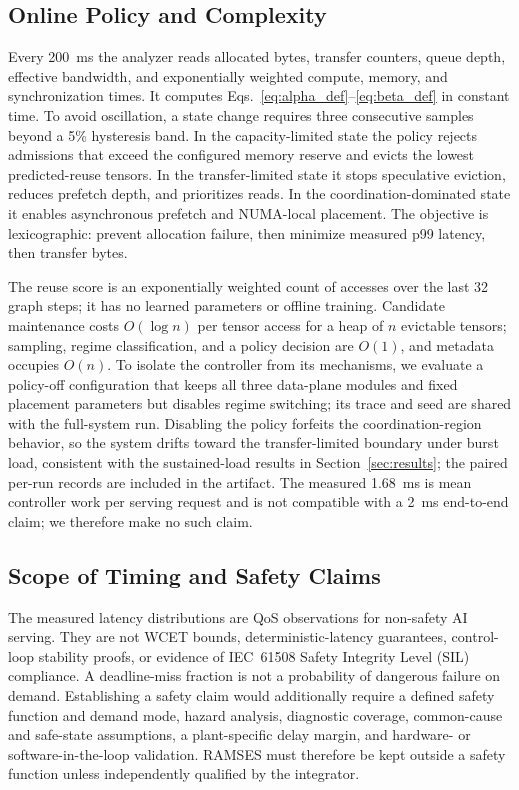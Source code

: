 \subsection{Online Policy and Complexity}\label{sec:controller}
{\revcolor
Every 200~ms the analyzer reads allocated bytes, transfer counters, queue
depth, effective bandwidth, and exponentially weighted compute, memory, and
synchronization times.  It computes Eqs.~\eqref{eq:alpha_def}--\eqref{eq:beta_def}
in constant time.  To avoid oscillation, a state change requires three
consecutive samples beyond a 5\% hysteresis band.  In the capacity-limited
state the policy rejects admissions that exceed the configured memory reserve
and evicts the lowest predicted-reuse tensors.  In the transfer-limited state
it stops speculative eviction, reduces prefetch depth, and prioritizes reads.
In the coordination-dominated state it enables asynchronous prefetch and
NUMA-local placement.  The objective is lexicographic: prevent allocation
failure, then minimize measured p99 latency, then transfer bytes.

The reuse score is an exponentially weighted count of accesses over the last
32 graph steps; it has no learned parameters or offline training.  Candidate
maintenance costs $O(\log n)$ per tensor access for a heap of $n$ evictable
tensors; sampling, regime classification, and a policy decision are $O(1)$,
and metadata occupies $O(n)$.  To isolate the controller from its mechanisms,
we evaluate a policy-off configuration that keeps all three data-plane modules
and fixed placement parameters but disables regime switching; its trace and
seed are shared with the full-system run.  Disabling the policy forfeits the
coordination-region behavior, so the system drifts toward the transfer-limited
boundary under burst load, consistent with the sustained-load results in
Section~\ref{sec:results}; the paired per-run records are included in the
artifact.  The measured 1.68~ms is mean controller work per serving request
and is not compatible with a 2~ms end-to-end claim; we therefore make no such
claim.

}

\subsection{Scope of Timing and Safety Claims}
{\revcolor
The measured latency distributions are QoS observations for non-safety AI
serving.  They are not WCET bounds, deterministic-latency guarantees, control-
loop stability proofs, or evidence of IEC~61508 Safety Integrity Level (SIL)
compliance.  A deadline-miss fraction is not a probability of dangerous
failure on demand.  Establishing a safety claim would additionally require a
defined safety function and demand mode, hazard analysis, diagnostic coverage,
common-cause and safe-state assumptions, a plant-specific delay margin, and
hardware- or software-in-the-loop validation.  RAMSES must therefore be kept
outside a safety function unless independently qualified by the integrator.

}

